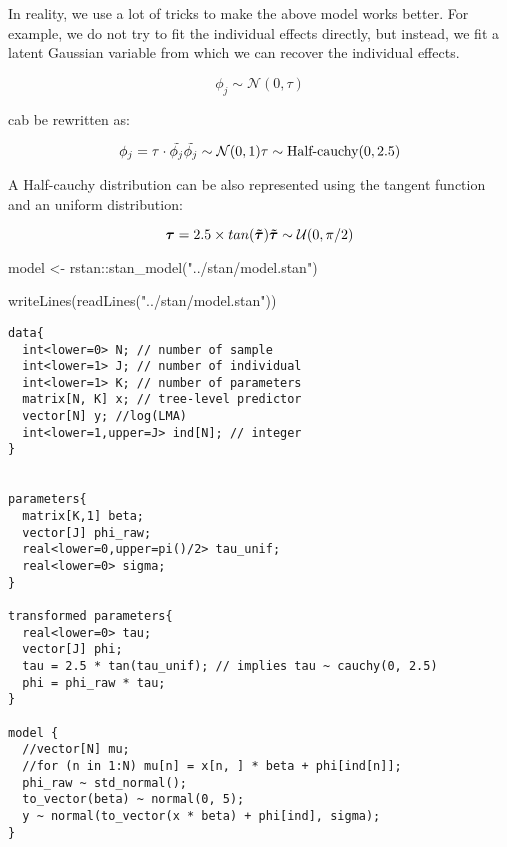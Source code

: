 \documentclass[
]{article}
\newenvironment{Shaded}{\begin{snugshade}}{\end{snugshade}}
\newcommand{\FunctionTok}[1]{\textcolor[rgb]{0.00,0.00,0.00}{#1}}
\newcommand{\NormalTok}[1]{#1}
\newcommand{\OtherTok}[1]{\textcolor[rgb]{0.56,0.35,0.01}{#1}}
\newcommand{\SpecialCharTok}[1]{\textcolor[rgb]{0.00,0.00,0.00}{#1}}
\newcommand{\StringTok}[1]{\textcolor[rgb]{0.31,0.60,0.02}{#1}}
\begin{document}
In reality, we use a lot of tricks to make the above model works better.
For example, we do not try to fit the individual effects directly, but
instead, we fit a latent Gaussian variable from which we can recover the
individual effects.

\[
\phi_j  \sim \mathcal{N}(0, \tau)
\]

cab be rewritten as:

\[
\phi_j =  \tau \cdot \tilde{\phi_j} \\
\tilde{\phi_j} \sim \mathcal{N}(0, 1) \\
\tau \sim \text{Half-cauchy}(0, 2.5)\\
\]

A Half-cauchy distribution can be also represented using the tangent
function and an uniform distribution:

\[
\boldsymbol{\tau} = 2.5 \times tan(\boldsymbol{\tilde{\tau}}) \\
\boldsymbol{\tilde{\tau}} \sim \mathcal{U}(0, \pi / 2)
\]

\begin{Shaded}
\begin{Highlighting}[]
\NormalTok{model }\OtherTok{\textless{}{-}}\NormalTok{ rstan}\SpecialCharTok{::}\FunctionTok{stan\_model}\NormalTok{(}\StringTok{"../stan/model.stan"}\NormalTok{)}
\end{Highlighting}
\end{Shaded}

\begin{Shaded}
\begin{Highlighting}[]
\FunctionTok{writeLines}\NormalTok{(}\FunctionTok{readLines}\NormalTok{(}\StringTok{"../stan/model.stan"}\NormalTok{))}
\end{Highlighting}
\end{Shaded}

\begin{verbatim}
data{
  int<lower=0> N; // number of sample
  int<lower=1> J; // number of individual
  int<lower=1> K; // number of parameters
  matrix[N, K] x; // tree-level predictor
  vector[N] y; //log(LMA)
  int<lower=1,upper=J> ind[N]; // integer
}


parameters{
  matrix[K,1] beta;
  vector[J] phi_raw;
  real<lower=0,upper=pi()/2> tau_unif;
  real<lower=0> sigma;
}

transformed parameters{
  real<lower=0> tau;
  vector[J] phi;
  tau = 2.5 * tan(tau_unif); // implies tau ~ cauchy(0, 2.5)
  phi = phi_raw * tau;
}

model {
  //vector[N] mu;
  //for (n in 1:N) mu[n] = x[n, ] * beta + phi[ind[n]];
  phi_raw ~ std_normal();
  to_vector(beta) ~ normal(0, 5);
  y ~ normal(to_vector(x * beta) + phi[ind], sigma);
}
\end{verbatim}
\end{document}
